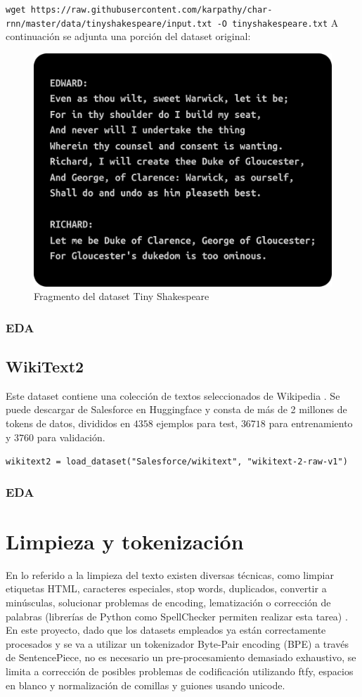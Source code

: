 \documentclass[11pt]{book}
\begin{document}
\texttt{wget https://raw.githubusercontent.com/karpathy/char-rnn/master/data/tinyshakespeare/input.txt -O tinyshakespeare.txt}
A continuación se adjunta una porción del dataset original: 
\begin{figure}[h]
    \centering
    \includegraphics[width=0.5\linewidth]{img/tiny_shakespeare.png}
    \caption{Fragmento del dataset Tiny Shakespeare}
    \label{fig:placeholder1}
\end{figure}

\subsubsection{EDA}


\subsection{WikiText2}
Este dataset contiene una colección de textos seleccionados de Wikipedia \parencite{huggingface_wikitext} \parencite{autonlp2020linkedwikitext}. Se puede descargar de Salesforce en Huggingface y consta de más de 2 millones de tokens de datos, divididos en $4358$ ejemplos para test, $36718$ para entrenamiento y $3760$ para validación. 


\texttt{wikitext2 = load\_dataset("Salesforce/wikitext", "wikitext-2-raw-v1")}

\subsubsection{EDA}


\section{Limpieza y tokenización}

En lo referido a la limpieza del texto existen diversas técnicas, como limpiar etiquetas HTML, caracteres especiales, stop words, duplicados, convertir a minúsculas, solucionar problemas de encoding, lematización o corrección de palabras (librerías de Python como SpellChecker permiten realizar esta tarea) \parencite{shabbir2021cleaning}. En este proyecto, dado que los datasets empleados ya están correctamente procesados y se va a utilizar un tokenizador Byte-Pair encoding (BPE) a través de SentencePiece, no es necesario un pre-procesamiento demasiado exhaustivo, se limita a corrección de posibles problemas de codificación utilizando ftfy, espacios en blanco y normalización de comillas y guiones usando unicode.
\end{document}
